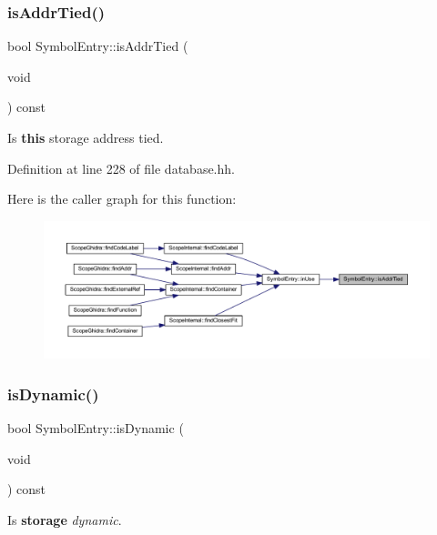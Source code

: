 \subsubsection{\texorpdfstring{isAddrTied()}{isAddrTied()}}
{\footnotesize\ttfamily bool Symbol\+Entry\+::is\+Addr\+Tied (\begin{DoxyParamCaption}\item[{void}]{ }\end{DoxyParamCaption}) const\hspace{0.3cm}{\ttfamily [inline]}}



Is {\bfseries{this}} storage address tied. 



Definition at line 228 of file database.\+hh.

Here is the caller graph for this function\+:
\nopagebreak
\begin{figure}[H]
\begin{center}
\leavevmode
\includegraphics[width=350pt]{class_symbol_entry_a8e2a7fd30276da3672340e5424aadad9_icgraph}
\end{center}
\end{figure}
\mbox{\label{class_symbol_entry_a30c4c7a954f6d5d4bc0e50d78b16077e}} 
\subsubsection{\texorpdfstring{isDynamic()}{isDynamic()}}
{\footnotesize\ttfamily bool Symbol\+Entry\+::is\+Dynamic (\begin{DoxyParamCaption}\item[{void}]{ }\end{DoxyParamCaption}) const\hspace{0.3cm}{\ttfamily [inline]}}



Is {\bfseries{storage}} {\itshape dynamic}. 




